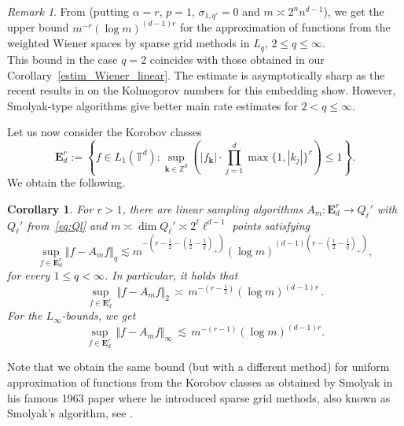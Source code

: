 \documentclass[a4paper,12pt]{amsart}
\newtheorem{corollary}[theorem]{Corollary}
\theoremstyle{definition}
\theoremstyle{remark}
\newtheorem{remark}[theorem]{Remark}
\newcommand{\abs}[1]{\left|#1\right|}
\newcommand{\bk}{\mathbf{k}}
\begin{document}
{\medskip

\begin{remark}
From \cite[Thm. 5.1 (Remark\ 6.4)]{Kol_Lomako_Tikhonov23} 
(putting $\alpha =r$, 
 $p=1$, $\sigma_{1,q'}=0$
and
$m\asymp 2^n n^{d-1}$), we get the upper bound $m^{-r} (\log m)^{(d-1)r}$ for the approximation of functions from 
 the weighted
Wiener spaces by sparse grid methods 
 in $L_q$, $2\leq q \leq \infty$.
\\
This bound in the case $q=2$ coincides with those obtained in our Corollary~\ref{estim_Wiener_linear}. 
 {The estimate}
is asymptotically sharp as the recent results in \cite{NNS} on the Kolmogorov numbers for this embedding show.
However, Smolyak-type algorithms give better main rate estimates  {for
$2<q\leq \infty$.}
\end{remark}


Let us now consider the Korobov classes
$$
\mathbf{E}^r_d  := \left\{ 
f\in L_1(\mathbb{T}^d) \colon  \sup_{\bk \in \mathbb{Z}^d } \left( \abs{f_{\bk}} \cdot \prod_{j=1}^{d}\max \{1,  \abs{k_j}\}^{r} \right) \leq 1  \right\}.
$$
We obtain the following.

\begin{corollary}\label{estim_Korobov_linear_L_2}
	For $r>1$, there are linear sampling algorithms $A_m \colon \mathbf{E}^r_d \to Q_\ell'$ with $Q_\ell'$ from~\eqref{eq:Ql} and $m \asymp \dim Q_\ell' \asymp 2^\ell \ell^{d-1}$
     {points}
    satisfying
	$$
\sup_{f\in \mathbf{E}^r_d} \Vert f - A_m f  \Vert_q \lesssim 
m^{-(r -  \frac{1}{2} - (\frac{1}{2}-\frac{1}{q})_+)}
(\log m)^{(d-1)(r - (\frac{1}{2}-\frac{1}{q})_+)},
$$
for every 
{$1\leq q < \infty$.
In particular, 	it 
 {holds that}
$$
\sup_{f\in \mathbf{E}^r_d}\,  \Vert f - A_m f  \Vert_2 
\,  \asymp\, m^{-(r - \frac{1}{2})} (\log m)^{(d-1)r} \, .
	$$
For the $L_\infty$-bounds,	we get
$$
\sup_{f\in \mathbf{E}^r_d}\,  \Vert f - A_m f  \Vert_\infty 
	\,  \lesssim\, m^{-(r -1)} (\log m)^{(d-1)r}.
$$
}
\end{corollary}




Note that we obtain the same bound (but with a different method) for uniform approximation of functions from the Korobov classes as obtained by Smolyak in his famous 1963 paper where he introduced sparse grid methods, also known as Smolyak's algorithm, see \cite[p.~1044]{Sm}.


}
\end{document}

